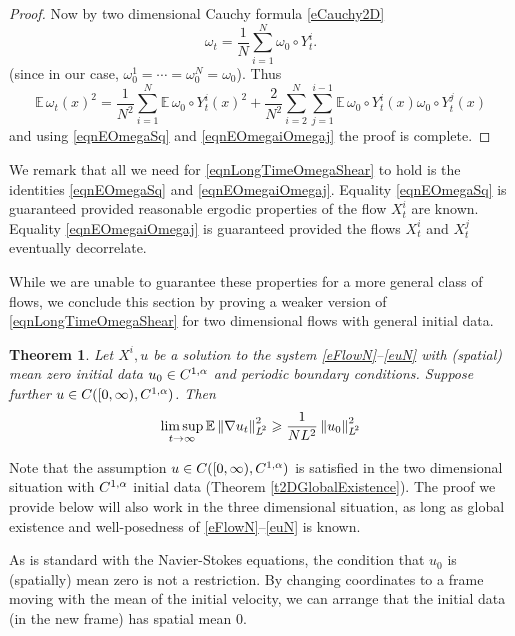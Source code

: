 \documentclass[final]{amsart}%
\newcommand{\mceuler}{\eqref{eFlowN}--\eqref{euN}\xspace}
\newcommand{\grad}{\nabla}
\renewcommand{\geq}{\geqslant}
\newcommand{\E}{\mathbb{E}}
\newcommand{\holderspace}[2]{\ensuremath{C^{\ifx0#1{#2}\else{#1,#2}\fi}}}
\newif\iftextstyle
\newcommand{\norm}[1]{\iftextstyle\lVert#1\rVert\else\left\lVert#1\right\rVert\fi}
\newcommand{\lpnorm}[2]{\norm{#1}_{\smash{L^{\!#2}_{\vphantom{h}}}\vphantom{L^{\!#2}}}}
\numberwithin{equation}{section}
\newtheorem{theorem}{Theorem}[section]
\theoremstyle{definition}
\theoremstyle{remark}
\begin{document}
\begin{proof}
Now by two dimensional Cauchy formula \eqref{eCauchy2D}
$$
\omega_t = \frac{1}{N} \sum_{i=1}^N \omega_0 \circ Y^i_t.
$$
(since in our case, $\omega^1_0 = \cdots = \omega^N_0 = \omega_0$). Thus
\begin{equation}
  \E\,\omega_t(x)^2 = \frac{1}{N^2} \sum_{i=1}^N \E\,\omega_0 \circ
  Y^i_t (x)^2 + \frac{2}{N^2} \sum_{i=2}^N \sum_{j = 1}^{i-1} \E\,
  \omega_0 \circ Y^i_t(x) \omega_0 \circ Y^j_t(x) 
\end{equation}
and using \eqref{eqnEOmegaSq} and \eqref{eqnEOmegaiOmegaj} the proof is complete.
\end{proof}%

We remark that all we need for \eqref{eqnLongTimeOmegaShear} to hold is the identities \eqref{eqnEOmegaSq} and \eqref{eqnEOmegaiOmegaj}. Equality \eqref{eqnEOmegaSq} is guaranteed provided reasonable ergodic properties of the flow $X^i_t$ are known. Equality \eqref{eqnEOmegaiOmegaj} is guaranteed provided the flows $X^i_t$ and $X^j_t$ eventually decorrelate.

While we are unable to guarantee these properties for a more general class of flows, we conclude this section by proving a weaker version of \eqref{eqnLongTimeOmegaShear} for two dimensional flows with general initial data.

\begin{theorem}\label{tLimSupGradULowerBound}%
  Let $X^i, u$ be a solution to the system \mceuler with (spatial)
  mean zero initial data $u_0 \in \holderspace{1}{\alpha}$ and
  periodic boundary conditions. Suppose further $u \in C( [0,\infty),
  \holderspace{1}{\alpha} )$. Then
\begin{equation}\label{eLimSupGradULowerBound}
\limsup_{t \to \infty} \E \lpnorm{\grad u_t}{2}^2 \geq \frac{1}{N L^2}
\lpnorm{u_0}{2}^2 
\end{equation}
\end{theorem}%

Note that the assumption $u \in C( [0,\infty),
\holderspace{1}{\alpha})$ is satisfied in the two dimensional
situation with $\holderspace{1}{\alpha}$ initial data (Theorem
\ref{t2DGlobalExistence}). The proof we provide below will also work
in the three dimensional situation, as long as global existence and
well-posedness of \mceuler is known.

As is standard with the Navier-Stokes equations, the condition that
$u_0$ is (spatially) mean zero is not a restriction. By changing
coordinates to a frame moving with the mean of the initial velocity,
we can arrange that the initial data (in the new frame) has spatial
mean $0$.
\end{document}
